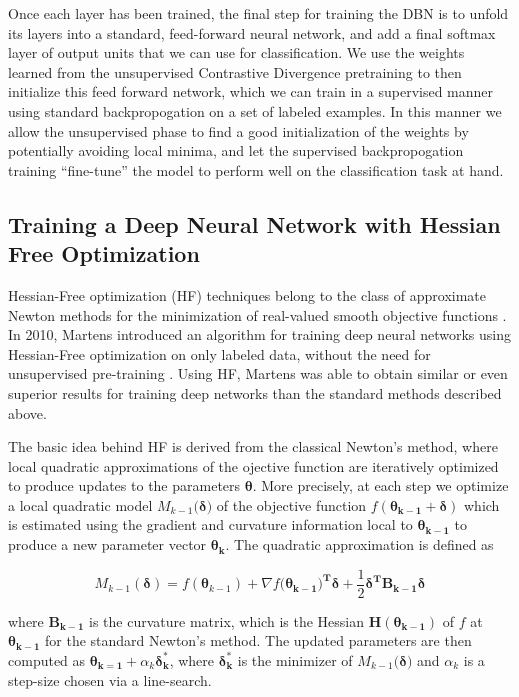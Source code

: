 \documentclass{article}
\begin{document}
Once each layer has been trained, the final step for training the DBN is to
unfold its layers into a standard, feed-forward neural network, and add a final
softmax layer of output units that we can use for classification. We use the
weights learned from the unsupervised Contrastive Divergence pretraining to
then initialize this feed forward network, which we can train in a supervised
manner using standard backpropogation on a set of labeled examples. In this
manner we allow the unsupervised phase to find a good initialization of the
weights by potentially avoiding local minima, and let the supervised
backpropogation training ``fine-tune'' the model to perform well on the
classification task at hand.

\subsection{Training a Deep Neural Network with Hessian Free Optimization}

Hessian-Free optimization (HF) techniques belong to the class of approximate
Newton methods for the minimization of real-valued smooth objective functions
\cite{martens2012training}. In 2010, Martens introduced an algorithm for
training deep neural networks using Hessian-Free optimization on only labeled
data, without the need for unsupervised pre-training \cite{martens2010deep}.
Using HF, Martens was able to obtain similar or even superior results for
training deep networks than the standard methods described above. 

The basic idea behind HF is derived from the classical Newton's method, where
local quadratic approximations of the ojective function are iteratively
optimized to produce updates to the parameters $\mathbf{\theta}$.  More
precisely, at each step we optimize a local quadratic model
$M_{k-1}(\mathbf{\delta)}$ of the objective function $f(\mathbf{\theta_{k-1}} +
\mathbf{\delta})$ which is estimated using the gradient and curvature
information local to $\mathbf{\theta_{k-1}}$ to produce a new parameter vector
$\mathbf{\theta_k}$. The quadratic approximation is defined as

\[
  M_{k-1}(\mathbf{\delta}) = f(\mathbf{\theta}_{k-1})
  + \nabla f(\mathbf{\theta_{k-1})^T \delta}
  + \frac{1}{2} \mathbf{\delta^T B_{k-1} \delta}
\]

where $\mathbf{B_{k-1}}$ is the curvature matrix, which is the Hessian
$\mathbf{H(\theta_{k-1})}$ of $f$ at $\mathbf{\theta_{k-1}}$ for the standard
Newton's method. The updated parameters are then computed as
$\mathbf{\theta_{k=1}} + \alpha_k \mathbf{\delta^{*}_{k}}$, where
$\mathbf{\delta^{*}_{k}}$ is the minimizer of $M_{k-1}(\mathbf{\delta)}$ and
$\alpha_k$ is a step-size chosen via a line-search.
\end{document}
